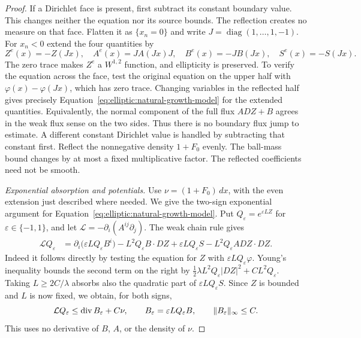 \begin{proof}
If a Dirichlet face is present, first subtract its constant boundary
value.  This changes neither the equation nor its source bounds.
The reflection creates no measure on that face.  Flatten it as
$\{x_n=0\}$ and write $J=\operatorname{diag}(1,\ldots,1,-1)$.
For $x_n<0$ extend the four quantities by
\begin{equation}\label{eq:elliptic:ng-reflection}
 Z^e(x)=-Z(Jx),\quad A^e(x)=JA(Jx)J,\quad
 B^e(x)=-JB(Jx),\quad S^e(x)=-S(Jx).
\end{equation}
The zero trace makes $Z^e$ a $W^{1,2}$ function, and ellipticity is
preserved.  To verify the equation across the face, test the original
equation on the upper half with $\varphi(x)-\varphi(Jx)$, which has
zero trace.  Changing variables in the reflected half gives precisely
Equation~\eqref{eq:elliptic:natural-growth-model} for the extended quantities.  Equivalently,
the normal component of the full flux $ADZ+B$ agrees in the weak flux sense on the two sides.
Thus there is no boundary flux jump to estimate.  A different constant
Dirichlet value is handled by subtracting that constant first.  Reflect the nonnegative density $1+F_0$ evenly.  The ball-mass bound
changes by at most a fixed multiplicative factor.  The reflected
coefficients need not be smooth.

\medskip\noindent\emph{Exponential absorption and potentials.}
Use $\nu=(1+F_0)\,dx$, with the even extension just described where
needed.  We give the two-sign exponential argument for
Equation~\eqref{eq:elliptic:natural-growth-model}.  Put
$Q_\varepsilon=e^{\varepsilon LZ}$ for $\varepsilon\in\{-1,1\}$,
and let $\mathcal L=-\partial_i(A^{ij}\partial_j)$.
The weak chain rule gives
\begin{align}
 \mathcal L Q_\varepsilon
 &=\partial_i\bigl(\varepsilon LQ_\varepsilon B^i\bigr)
   -L^2Q_\varepsilon B\cdot DZ
   +\varepsilon LQ_\varepsilon S
   -L^2Q_\varepsilon A DZ\cdot DZ.\label{eq:elliptic:ng-exp-identity}
\end{align}
Indeed it follows directly by testing the equation for $Z$ with
$\varepsilon LQ_\varepsilon\varphi$.  Young's inequality bounds the
second term on the right by
$\tfrac12\lambda L^2Q_\varepsilon|DZ|^2+C L^2Q_\varepsilon$.
Taking $L\ge 2C/\lambda$ absorbs also the quadratic part of
$\varepsilon LQ_\varepsilon S$.  Since $Z$ is bounded and $L$ is
now fixed, we obtain, for both signs,
\begin{equation}\label{eq:elliptic:ng-exp-inequality}
 \mathcal L Q_\varepsilon
       \le \operatorname{div} B_\varepsilon+C\nu,
 \qquad B_\varepsilon=\varepsilon LQ_\varepsilon B,
 \qquad \|B_\varepsilon\|_\infty\le C.
\end{equation}
This uses no derivative of $B$, $A$, or the density of $\nu$.


\end{proof}
